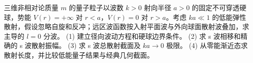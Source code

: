 三维非相对论质量 \(m\) 的量子粒子以波数 \(k>0\) 射向半径 \(a>0\) 的固定不可穿透硬球，势能 \(V(r)=+\infty\) 对 \(r<a\)，\(V(r)=0\) 对 \(r>a\)。考虑 \(ka\ll1\) 的低能弹性散射，假设忽略自旋和反冲；远区波函数按入射平面波与外向球面散射波叠加，求主导的 \(l=0\) 分波。
(1) 建立径向波动方程和硬球边界条件。
(2) 求 s 波相移和精确的 s 波散射振幅。
(3) 求 s 波总散射截面及 \(ka\to0\) 极限。
(4) 从零能渐近态求散射长度，并比较低能量子结果与经典几何截面。
